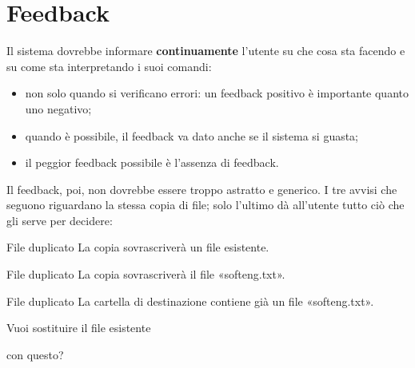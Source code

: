\section{Feedback}

Il sistema dovrebbe informare \textbf{continuamente} l'utente su che cosa sta facendo e su come sta interpretando i suoi
comandi:

\begin{itemize}
  \item non solo quando si verificano errori: un feedback positivo è importante quanto uno negativo;
  \item quando è possibile, il feedback va dato anche se il sistema si guasta;
  \item il peggior feedback possibile è l'assenza di feedback.
\end{itemize}

Il feedback, poi, non dovrebbe essere troppo astratto e generico. I tre avvisi che seguono riguardano la stessa
copia di file; solo l'ultimo dà all'utente tutto ciò che gli serve per decidere:

\begin{center}
\begin{minipage}[t]{0.27\linewidth}\centering
  \begin{finestra}{File duplicato}
    La copia sovrascriverà un file esistente.
  \end{finestra}\par\smallskip\male
\end{minipage}\hfill
\begin{minipage}[t]{0.27\linewidth}\centering
  \begin{finestra}{File duplicato}
    La copia sovrascriverà il file «softeng.txt».
  \end{finestra}\par\smallskip\bene
\end{minipage}\hfill
\begin{minipage}[t]{0.38\linewidth}\centering
  \begin{finestra}{File duplicato}
    La cartella di destinazione contiene già un file «softeng.txt».\par\smallskip
    Vuoi sostituire il file esistente\par
    \hspace*{1em}{\tiny Dimensione: 350 KB \quad Modificato: 1 set 2024, 17:45}\par
    con questo?\par
    \hspace*{1em}{\tiny Dimensione: 580 KB \quad Modificato: 12 set 2024, 11:37}
  \end{finestra}\par\smallskip\benissimo
\end{minipage}
\end{center}


